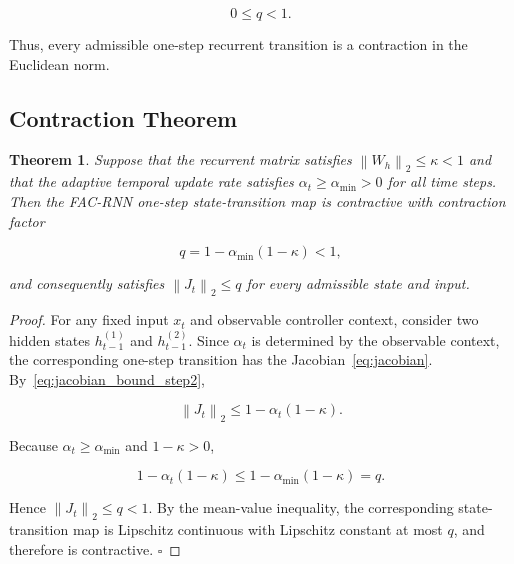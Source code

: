 \documentclass[journal]{IEEEtran}
\newtheorem{theorem}{Theorem}
\begin{document}
\begin{equation}
	0\leq q<1.
	\label{eq:q_less_one}
\end{equation}

Thus, every admissible one-step recurrent transition is a contraction in the Euclidean norm.


\subsection{Contraction Theorem}
\label{subsec:contraction_theorem}

\begin{theorem}
	Suppose that the recurrent matrix satisfies $\left\lVert W_h\right\rVert_2\leq\kappa<1$ and that the adaptive temporal update rate satisfies $\alpha_t\geq\alpha_{\min}>0$ for all time steps. Then the FAC-RNN one-step state-transition map is contractive with contraction factor
	
	\begin{equation}
		q
		=
		1-\alpha_{\min}(1-\kappa)
		<
		1,
		\label{eq:theorem_q}
	\end{equation}
	
	and consequently satisfies $\left\lVert J_t\right\rVert_2\leq q$ for every admissible state and input.
	
\end{theorem}

\begin{proof}
	For any fixed input $x_t$ and observable controller context, consider two hidden states $h_{t-1}^{(1)}$ and $h_{t-1}^{(2)}$. Since $\alpha_t$ is determined by the observable context, the corresponding one-step transition has the Jacobian~\eqref{eq:jacobian}. By~\eqref{eq:jacobian_bound_step2},
	
	\begin{equation}
		\left\lVert J_t\right\rVert_2
		\leq
		1-\alpha_t(1-\kappa).
	\end{equation}
	
	Because $\alpha_t\geq\alpha_{\min}$ and $1-\kappa>0$,
	
	\begin{equation}
		1-\alpha_t(1-\kappa)
		\leq
		1-\alpha_{\min}(1-\kappa)
		=
		q.
	\end{equation}
	
	Hence $\left\lVert J_t\right\rVert_2\leq q<1$. By the mean-value inequality, the corresponding state-transition map is Lipschitz continuous with Lipschitz constant at most $q$, and therefore is contractive. \hfill$\square$
\end{proof}
	
\end{document}
